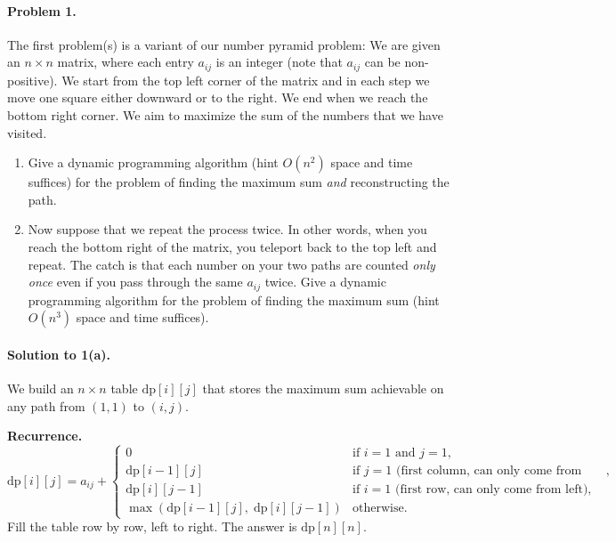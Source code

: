 \documentclass[10pt]{article}
\begin{document}
\paragraph{Problem 1.} The first problem(s) is a variant of our number pyramid problem: We are given an $n \times n$ matrix, where each entry $a_{ij}$ is an integer (note that $a_{ij}$ can be non-positive).  We start from the top left corner of the matrix and in each step we move one square either downward or to the right.  We end when we reach the bottom right corner.  We aim to maximize the sum of the numbers that we have visited.  
\begin{enumerate}
    \item Give a dynamic programming algorithm (hint $O(n^2)$ space and time suffices) for the problem of finding the maximum sum \emph{and} reconstructing the path.

    \item Now suppose that we repeat the process twice.  In other words, when you reach the bottom right of the matrix, you teleport back to the top left and repeat.  The catch is that each number on your two paths are counted \emph{only once} even if you pass through the same $a_{ij}$ twice.  Give a dynamic programming algorithm for the problem of finding the maximum sum (hint $O(n^3)$ space and time suffices).
    
\end{enumerate}

\paragraph{Solution to 1(a).}

We build an $n \times n$ table $\text{dp}[i][j]$ that stores the maximum sum achievable on any path from $(1,1)$ to $(i,j)$.

\textbf{Recurrence.}
\[
\text{dp}[i][j] = a_{ij} + 
\begin{cases}
0 & \text{if } i = 1 \text{ and } j = 1,\\
\text{dp}[i-1][j] & \text{if } j = 1 \text{ (first column, can only come from above)},\\
\text{dp}[i][j-1] & \text{if } i = 1 \text{ (first row, can only come from left)},\\
\max(\text{dp}[i-1][j],\; \text{dp}[i][j-1]) & \text{otherwise.}
\end{cases}
\]
Fill the table row by row, left to right.  The answer is $\text{dp}[n][n]$.
\end{document}
